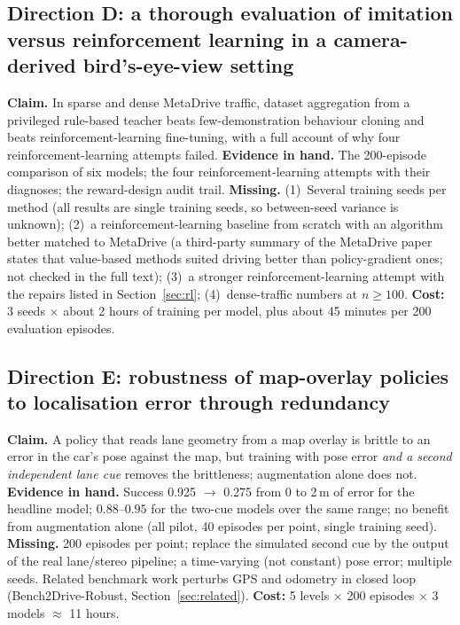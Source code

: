 \subsection{Direction D: a thorough evaluation of imitation versus reinforcement learning in a camera-derived bird's-eye-view setting}
\textbf{Claim.} In sparse and dense MetaDrive traffic, dataset aggregation from a privileged rule-based teacher beats few-demonstration behaviour cloning and beats reinforcement-learning fine-tuning, with a full account of why four reinforcement-learning attempts failed.
\textbf{Evidence in hand.} The 200-episode comparison of six models; the four reinforcement-learning attempts with their diagnoses; the reward-design audit trail.
\textbf{Missing.} (1)~Several training seeds per method (all results are single training seeds, so between-seed variance is unknown); (2)~a reinforcement-learning baseline from scratch with an algorithm better matched to MetaDrive (a third-party summary of the MetaDrive paper states that value-based methods suited driving better than policy-gradient ones; not checked in the full text); (3)~a stronger reinforcement-learning attempt with the repairs listed in Section~\ref{sec:rl}; (4)~dense-traffic numbers at $n\ge100$.
\textbf{Cost:} 3 seeds $\times$ about 2 hours of training per model, plus about 45 minutes per 200 evaluation episodes.

\subsection{Direction E: robustness of map-overlay policies to localisation error through redundancy}
\textbf{Claim.} A policy that reads lane geometry from a map overlay is brittle to an error in the car's pose against the map, but training with pose error \emph{and a second independent lane cue} removes the brittleness; augmentation alone does not.
\textbf{Evidence in hand.} Success 0.925 $\to$ 0.275 from 0 to 2\,m of error for the headline model; $0.88$--$0.95$ for the two-cue models over the same range; no benefit from augmentation alone (all pilot, 40 episodes per point, single training seed).
\textbf{Missing.} 200 episodes per point; replace the simulated second cue by the output of the real lane/stereo pipeline; a time-varying (not constant) pose error; multiple seeds. Related benchmark work perturbs GPS and odometry in closed loop (Bench2Drive-Robust, Section~\ref{sec:related}).
\textbf{Cost:} 5 levels $\times$ 200 episodes $\times$ 3 models $\approx$ 11 hours.

